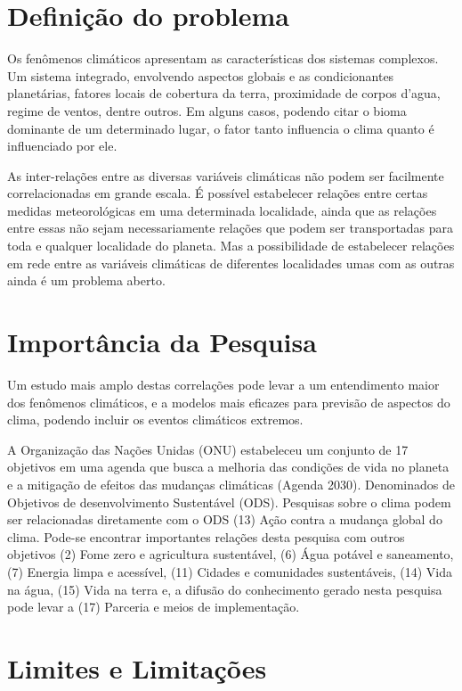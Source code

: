 \section{Definição do problema}
\label{sec:problema}

Os fenômenos climáticos apresentam as características dos sistemas complexos. Um sistema integrado, envolvendo aspectos globais e as condicionantes planetárias, fatores locais de cobertura da terra, proximidade de corpos d'agua, regime de ventos, dentre outros. Em alguns casos, podendo citar o bioma dominante de um determinado lugar, o fator tanto influencia o clima quanto é influenciado por ele.

As inter-relações entre as diversas variáveis climáticas não podem ser facilmente correlacionadas em grande escala. É possível estabelecer relações entre certas medidas meteorológicas em uma determinada localidade, ainda que as relações entre essas não sejam necessariamente relações que podem ser transportadas para toda e qualquer localidade do planeta. Mas a possibilidade de estabelecer relações em rede entre as variáveis climáticas de diferentes localidades umas com as outras ainda é um problema aberto.

\section{Importância da Pesquisa}
\label{sec:justificativa}

Um estudo mais amplo destas correlações pode levar a um entendimento maior dos fenômenos climáticos, e a modelos mais eficazes para previsão de aspectos do clima, podendo incluir os eventos climáticos extremos. 

A Organização das Nações Unidas (ONU) estabeleceu um conjunto de 17 objetivos em uma agenda que busca a melhoria das condições de vida no planeta e a mitigação de efeitos das mudanças climáticas (Agenda 2030). Denominados de Objetivos de desenvolvimento Sustentável (ODS). Pesquisas sobre o clima podem ser relacionadas diretamente com o ODS (13) Ação contra a mudança global do clima. Pode-se  encontrar importantes relações desta pesquisa com outros objetivos (2) Fome zero e agricultura sustentável, (6) Água potável e saneamento, (7) Energia limpa e acessível, (11) Cidades e comunidades sustentáveis, (14) Vida na água, (15) Vida na terra e, a difusão do conhecimento gerado nesta pesquisa pode levar a (17) Parceria e meios de implementação. 

\section{Limites e Limitações}
\label{sec:limites}


